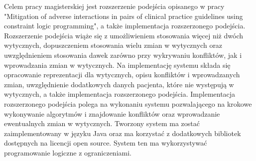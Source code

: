 \begin{spacing}{1.5}

Celem pracy magisterskiej jest rozszerzenie podejścia opisanego w pracy "Mitigation of adverse interactions in pairs of clinical practice guidelines using constraint logic programming"\cite{SzWilk2}, a także implementacja rozszerzonego podejścia. Rozszerzenie podejścia wiąże się z umożliwieniem stosowania więcej niż dwóch wytycznych, dopuszczeniem stosowania wielu zmian w wytycznych oraz uwzględnieniem stosowania dawek zarówno przy wykrywaniu konfliktów, jak i wprowadzania zmian w wytycznych. Na implementację systemu składa się opracowanie reprezentacji dla wytycznych, opisu konfliktów i wprowadzanych zmian, uwzględnienie dodatkowych danych pacjenta, które nie występują w wytycznych, a także implementacja rozszerzonego podejścia. Implementacja rozszerzonego podejścia polega na wykonaniu systemu pozwalającego na krokowe wykonywanie algorytmów i znajdowanie konfliktów oraz wprowadzanie ewentualnych zmian w wytycznych. Tworzony system ma zostać zaimplementowany w języku Java oraz ma korzystać z dodatkowych bibliotek dostępnych na licencji open source. System ten ma wykorzystywać programowanie logiczne z ograniczeniami.



\end{spacing}
